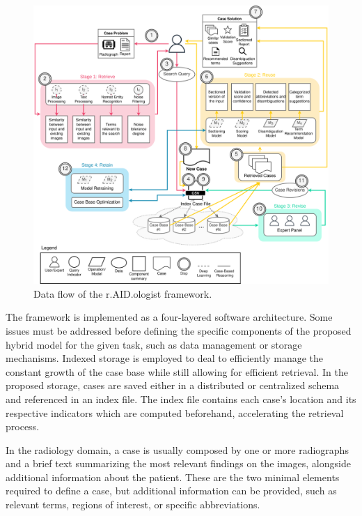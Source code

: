 \begin{figure}[t]
    \centering
    \includegraphics[width=\linewidth]{5_dlintegrationkbs/figures/raidologist_flow.eps}
    \caption{Data flow of the r.AID.ologist framework.}
    \label{fig:raidologist_data_flow}
\end{figure}

The framework is implemented as a four-layered software architecture. Some issues must be addressed before defining the specific components of the proposed hybrid model for the given task, such as data management or storage mechanisms. Indexed storage is employed to deal to efficiently manage the constant growth of the case base while still allowing for efficient retrieval. In the proposed storage, cases are saved either in a distributed or centralized schema and referenced in an index file. The index file contains each case's location and its respective indicators which are computed beforehand, accelerating the retrieval process. 

In the radiology domain, a case is usually composed by one or more radiographs and a brief text summarizing the most relevant findings on the images, alongside additional information about the patient. These are the two minimal elements required to define a case, but additional information can be provided, such as relevant terms, regions of interest, or specific abbreviations. 

